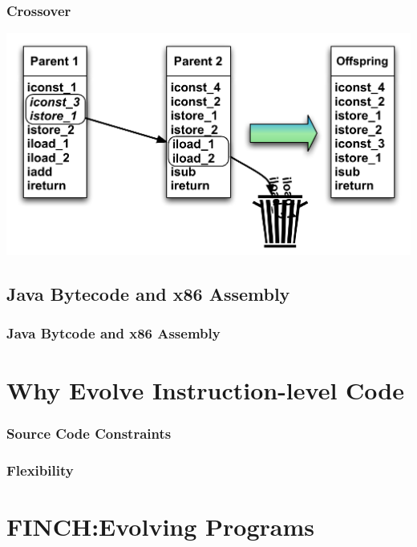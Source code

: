\documentclass{beamer}
\begin{document}
\begin{frame}
	\frametitle{Crossover}

   \includegraphics[width=1\textwidth]{Illustrations/crossover.pdf}
       \\

\end{frame}


\subsection[Bytecode and Assembly]{Java Bytecode and x86 Assembly}
\begin{frame}
\frametitle{Java Bytcode and x86 Assembly}
\end{frame}

\section[Why Instruction-level code]{Why Evolve Instruction-level Code}

\begin{frame}
	\frametitle{Source Code Constraints}
\end{frame}

\begin{frame}
	\frametitle{Flexibility}
\end{frame}

\section[FINCH]{FINCH:Evolving Programs}
\end{document}
